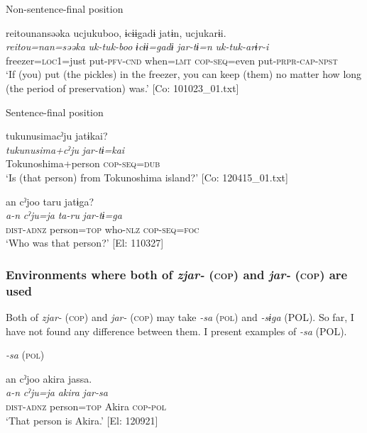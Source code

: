   Non-sentence-final position

\ea  {\TM}
\glll  {\textbar}reitou{\textbar}nansəəka  ucjukuboo,  ɨcɨɨgadɨ  jatɨn,      ucjukarɨi.\\
\textit{reitou=nan=səəka}  \textit{uk-tuk-boo}  \textit{ɨcɨɨ=gadɨ}  \textit{jar-tɨ=n}      \textit{uk-tuk-arɨr-i}\\
freezer=\textsc{loc}1=just  put-\textsc{pfv}-\textsc{cnd}  when=\textsc{lmt}  \textsc{cop}-\textsc{seq}=even  put-\textsc{prpr}-\textsc{cap}-\textsc{npst}\\
\glt ‘If (you) put (the pickles) in the freezer, you can keep (them) no matter how long (the period of preservation) was.’ [Co: 101023\_01.txt]
\z

  Sentence-final position


\ex
{\TM}
\glll  tukunusimacˀju  jatɨkai?\\
\textit{tukunusima+cˀju}  \textit{jar-tɨ=kai}\\
Tokunoshima+person  \textsc{cop}-\textsc{seq}=\textsc{dub}\\
\glt ‘Is (that person) from Tokunoshima island?’ [Co: 120415\_01.txt]


\ex  {\TM}
\glll  an  cˀjoo  taru  jatɨga?\\
\textit{a-n}  \textit{cˀju=ja}  \textit{ta-ru}  \textit{jar-tɨ=ga}\\
\textsc{dist}-\textsc{adnz}  person=\textsc{top}  who-\textsc{nlz}  \textsc{cop}-\textsc{seq}=\textsc{foc}\\
\glt ‘Who was that person?’ [El: 110327]
\z
\z

\subsubsection{Environments where both of \textit{zjar-} (\textsc{cop}) and \textit{jar-} (\textsc{cop}) are used}

Both of \textit{zjar-} (\textsc{cop}) and \textit{jar-} (\textsc{cop}) may take \textit{-sa} (\textsc{pol}) and \textit{-sɨga} (POL). So far, I have not found any difference between them. I present examples of \textit{-sa} (POL).

\ea\label{ex:8-45}
\textit{-sa} (\textsc{pol})

\ea
{\TM}
\glll  an  cˀjoo  akira  jassa.\\
\textit{a-n}  \textit{cˀju=ja}  \textit{akira}  \textit{jar-sa}\\
\textsc{dist}-\textsc{adnz}  person=\textsc{top}  Akira  \textsc{cop}-\textsc{pol}\\
\glt ‘That person is Akira.’ [El: 120921]


